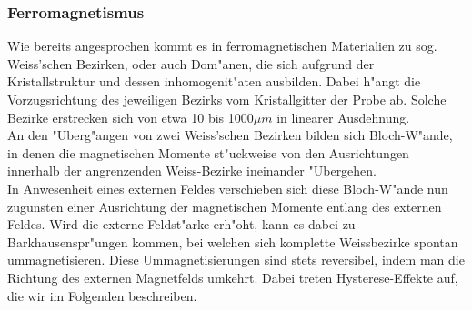         \subsubsection*{Ferromagnetismus}
            Wie bereits angesprochen kommt es in ferromagnetischen Materialien zu sog. Weiss'schen Bezirken,
            oder auch Dom"anen, die sich aufgrund der Kristallstruktur und dessen inhomogenit"aten ausbilden. Dabei
            h"angt die Vorzugsrichtung des jeweiligen Bezirks vom Kristallgitter der Probe ab. Solche
            Bezirke erstrecken sich von etwa 10 bis 1000$\mu m$ in linearer Ausdehnung.\\
            An den "Uberg"angen von zwei Weiss'schen Bezirken bilden sich Bloch-W"ande, in denen die magnetischen Momente st"uckweise von den Ausrichtungen innerhalb der angrenzenden Weiss-Bezirke ineinander "Ubergehen.\\
            In Anwesenheit eines externen Feldes verschieben sich diese Bloch-W"ande nun zugunsten einer Ausrichtung der magnetischen Momente entlang des externen Feldes. Wird die externe Feldst"arke erh"oht, kann es dabei zu Barkhausenspr"ungen kommen, bei welchen sich komplette Weissbezirke spontan ummagnetisieren. Diese Ummagnetisierungen sind stets reversibel, indem man die Richtung des externen Magnetfelds umkehrt. Dabei treten Hysterese-Effekte auf, die wir im Folgenden beschreiben.
